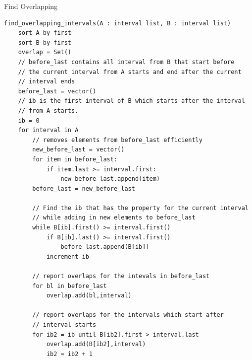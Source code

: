 \documentclass[12pt,twoside]{reedthesis}
\begin{document}
			
			
                    
\begin{algorithm}
    \caption{Find Overlapping}
    \label{algo:findoverlapping}
\begin{verbatim}
find_overlapping_intervals(A : interval list, B : interval list)
    sort A by first
    sort B by first
    overlap = Set()
    // before_last contains all interval from B that start before 
    // the current interval from A starts and end after the current
    // interval ends
    before_last = vector() 
    // ib is the first interval of B which starts after the interval
    // from A starts. 
    ib = 0
    for interval in A
        // removes elements from before_last efficiently
        new_before_last = vector()
        for item in before_last:
            if item.last >= interval.first:
                new_before_last.append(item)
        before_last = new_before_last
        
        // Find the ib that has the property for the current interval
        // while adding in new elements to before_last
        while B[ib].first() >= interval.first()
            if B[ib].last() >= interval.first()
                before_last.append(B[ib])
            increment ib

        // report overlaps for the intevals in before_last
        for bl in before_last
            overlap.add(bl,interval)

        // report overlaps for the intervals which start after
        // interval starts
        for ib2 = ib until B[ib2].first > interval.last
            overlap.add(B[ib2],interval)
            ib2 = ib2 + 1
\end{verbatim}
\end{algorithm}
		
\end{document}
